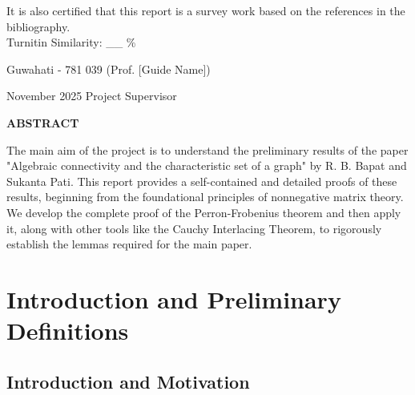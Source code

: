 \documentclass[12pt,a4paper]{report}
\theoremstyle{plain}
\theoremstyle{definition}
\theoremstyle{remark}
\begin{document}
\noindent
It is also certified that this report is a survey work based on the references
in the bibliography.\\

%

\noindent
Turnitin Similarity: \_\_ \%
%

\vspace{4cm}

\noindent Guwahati - 781 039 \hfill (Prof. [Guide Name])

\noindent November 2025 \hfill Project Supervisor

\clearpage

\begin{center}
{\Large{\bf{ABSTRACT}}}
\end{center}


The main aim of the project is to understand the preliminary results of the paper "Algebraic connectivity and the characteristic set of a graph" by R. B. Bapat and Sukanta Pati. This report provides a self-contained and detailed proofs of these results, beginning from the foundational principles of nonnegative matrix theory. We develop the complete proof of the Perron-Frobenius theorem and then apply it, along with other tools like the Cauchy Interlacing Theorem, to rigorously establish the lemmas required for the main paper.

\clearpage


\tableofcontents
\clearpage


\newpage

\setcounter{page}{1}

\chapter{Introduction and Preliminary Definitions}

\section{Introduction and Motivation}
\end{document}
